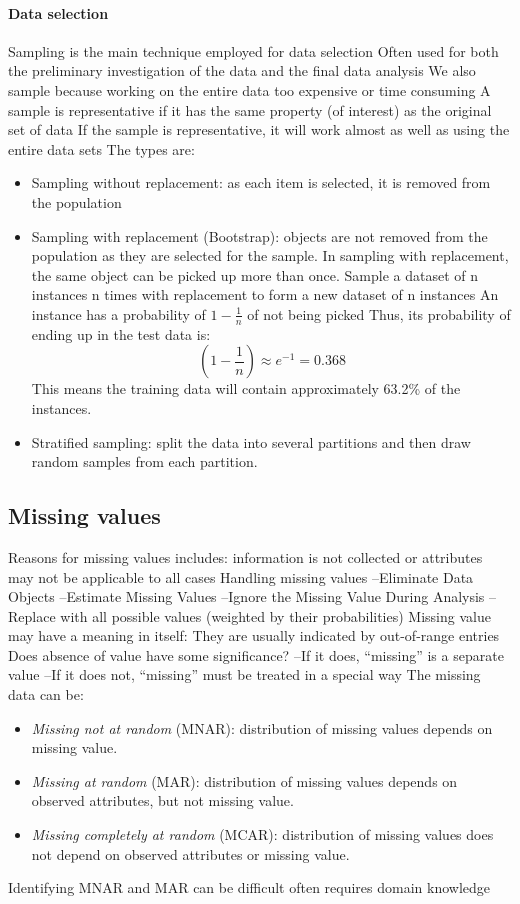 \paragraph*{Data selection}
Sampling is the main technique employed for data selection
Often used for both the preliminary investigation of the data and the final data analysis
We also sample because working on the entire data too expensive or time consuming
A sample is representative if it has the same property (of interest) as the original set of data
If the sample is representative, it will work almost as well as using the entire data sets
The types are: 
\begin{itemize}
    \item Sampling without replacement: as each item is selected, it is removed from the population
    \item Sampling with replacement (Bootstrap): objects are not removed from the population as they are selected for the sample.
        In sampling with replacement, the same object can be picked up more than once.
        Sample a dataset of n instances n times with replacement to form a new dataset of n instances
        An instance has a probability of $1-\frac{1}{n}$ of not being picked
        Thus, its probability of ending up in the test data is:
        \[\left(1-\dfrac{1}{n}\right)\approx e^{-1}=0.368\]
        This means the training data will contain approximately 63.2\% of the instances. 
    \item Stratified sampling: split the data into several partitions and then draw random samples from each partition. 
\end{itemize}


\subsection{Missing values}
Reasons for missing values includes: information is not collected or attributes may not be applicable to all cases
Handling missing values
–Eliminate Data Objects
–Estimate Missing Values
–Ignore the Missing Value During Analysis
– Replace with all possible values (weighted by their probabilities)
Missing value may have a meaning in itself: They are usually indicated by out-of-range entries
Does absence of value have some significance?
–If it does, “missing” is a separate value
–If it does not, “missing” must be treated in a special way
The missing data can be: 
\begin{itemize}
    \item \textit{Missing not at random} (MNAR): distribution of missing values depends on missing value.
    \item \textit{Missing at random} (MAR): distribution of missing values depends on observed attributes, but not missing value. 
    \item \textit{Missing completely at random} (MCAR): distribution of missing values does not depend on observed attributes or missing value.
\end{itemize}
\noindent Identifying MNAR and MAR can be difficult often requires domain knowledge 

